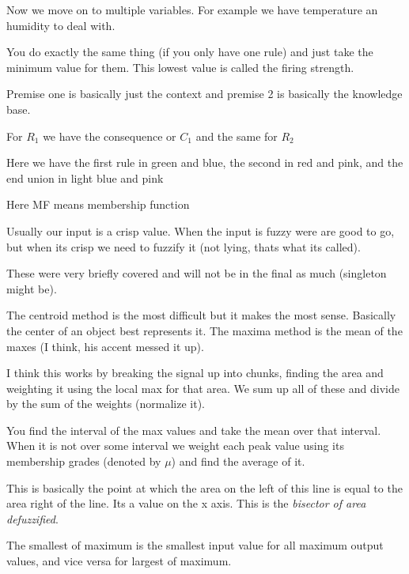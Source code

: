 \documentclass{article}
\begin{document}

Now we move on to multiple variables. For example we have temperature an humidity to deal with.

You do exactly the same thing (if you only have one rule) and just take the minimum value for them. This lowest value is called the firing strength.




Premise one is basically just the context and premise 2 is basically the knowledge base.

For $R_1$ we have the consequence  or $C_1$ and the same for $R_2$


Here we have the first rule in green and blue, the second in red and pink, and the end union in light blue and pink



Here MF means membership function


Usually our input is a crisp value. When the input is fuzzy were are good to go, but when its crisp we need to fuzzify it (not lying, thats what its called).


These were very briefly covered and will not be in the final as much (singleton might be).


The centroid method is the most difficult but it makes the most sense. Basically the center of an object best represents it. The maxima method is the mean of the maxes (I think, his accent messed it up).

I think this works by breaking the signal up into chunks, finding the area and weighting it using the local max for that area. We sum up all of these and divide by the sum of the weights (normalize it).


You find the interval of the max values and take the mean over that interval. When it is not over some interval we weight each peak value using its membership grades (denoted by $\mu$) and find the average of it.


This is basically the point at which the area on the left of this line is equal to the area right of the line. Its a value on the x axis. This is the \emph{bisector of area defuzzified}.

The smallest of maximum is the smallest input value for all maximum output values, and vice versa for largest of maximum.
\end{document}
